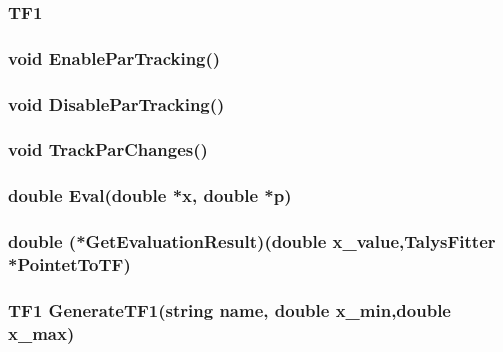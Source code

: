 \documentclass[a4paper,12pt]{extarticle}
\begin{document}
\subsubsection{TF1}
\subsubsection{void EnableParTracking()}
\subsubsection{void DisableParTracking()}
\subsubsection{void TrackParChanges()}
\subsubsection{double Eval(double *x, double *p)}
\subsubsection{double (*GetEvaluationResult)(double x_value,TalysFitter *PointetToTF)}
\subsubsection{TF1 GenerateTF1(string name, double x_min,double x_max)}
\end{document}

